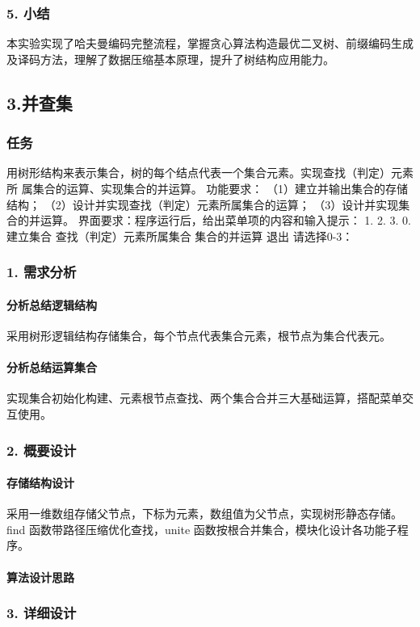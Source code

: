 \documentclass{ctexart}
\begin{document}
\subsubsection{5. 小结}
本实验实现了哈夫曼编码完整流程，掌握贪心算法构造最优二叉树、前缀编码生成及译码方法，理解了数据压缩基本原理，提升了树结构应用能力。


\subsection {3.并查集}
\subsubsection {任务}
用树形结构来表示集合，树的每个结点代表一个集合元素。实现查找（判定）元素所 属集合的运算、实现集合的并运算。 功能要求： （1）建立并输出集合的存储结构； （2）设计并实现查找（判定）元素所属集合的运算； （3）设计并实现集合的并运算。
界面要求：程序运行后，给出菜单项的内容和输入提示： 1. 2. 3. 0. 建立集合 查找（判定）元素所属集合 集合的并运算 退出 请选择0-3：

\subsubsection{1. 需求分析}
\paragraph{分析总结逻辑结构}
采用树形逻辑结构存储集合，每个节点代表集合元素，根节点为集合代表元。
\paragraph{分析总结运算集合}
实现集合初始化构建、元素根节点查找、两个集合合并三大基础运算，搭配菜单交互使用。
\subsubsection{2. 概要设计}
\paragraph{存储结构设计}
采用一维数组存储父节点，下标为元素，数组值为父节点，实现树形静态存储。
find 函数带路径压缩优化查找，unite 函数按根合并集合，模块化设计各功能子程序。
\paragraph{算法设计思路}
\subsubsection{3. 详细设计}
\end{document}
